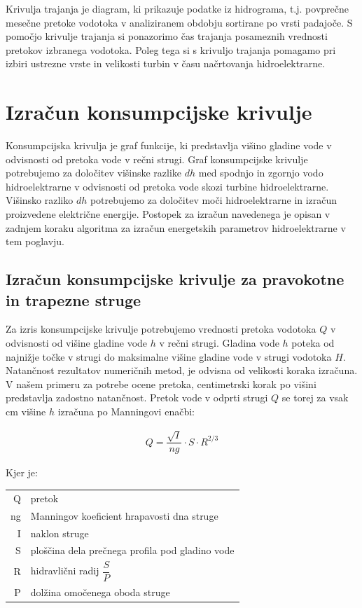 Krivulja trajanja je diagram, ki prikazuje podatke iz hidrograma, t.j. povprečne mesečne pretoke vodotoka v analiziranem obdobju sortirane po vrsti padajoče. S pomočjo krivulje trajanja si ponazorimo čas trajanja posameznih vrednosti pretokov izbranega vodotoka. Poleg tega si s krivuljo trajanja pomagamo pri izbiri ustrezne vrste in velikosti turbin v času načrtovanja hidroelektrarne.


\section{Izračun konsumpcijske krivulje}
Konsumpcijska krivulja je graf funkcije, ki predstavlja višino gladine vode v odvisnosti od pretoka vode v rečni strugi. Graf konsumpcijske krivulje potrebujemo za določitev višinske razlike $dh$ med spodnjo in zgornjo vodo hidroelektrarne v odvisnosti od pretoka vode skozi turbine hidroelektrarne. Višinsko razliko $dh$ potrebujemo za določitev moči hidroelektrarne in izračun proizvedene električne energije. Postopek za izračun navedenega je opisan v zadnjem koraku algoritma za izračun energetskih parametrov hidroelektrarne v tem poglavju.



\subsection{Izračun konsumpcijske krivulje za pravokotne in trapezne struge} \label{sec:teorija_trapeznaMetoda}
Za izris konsumpcijske krivulje potrebujemo vrednosti pretoka vodotoka $Q$ v odvisnosti od višine gladine vode $h$ v rečni strugi. Gladina vode $h$ poteka od najnižje točke v strugi do maksimalne višine gladine vode v strugi vodotoka $H$. Natančnost rezultatov numeričnih metod, je odvisna od velikosti koraka izračuna. V našem primeru za potrebe ocene pretoka, centimetrski korak po višini predstavlja zadostno natančnost. Pretok vode v odprti strugi $Q$ se torej za vsak cm višine $h$ izračuna po Manningovi enačbi: 

\begin{ceqn}
\begin{align}
Q = \dfrac{\sqrt{I}}{ng} \cdot S \cdot R^{2/3} \label{eq:ManningovaEnacba}
\end{align}
\end{ceqn}


Kjer je:
\begin{table}[H]
	\begin{tabular}{r|p{10cm}}
		Q & pretok \\
		ng & Manningov koeficient hrapavosti dna struge\\
		I & naklon struge \\
		S & ploščina dela prečnega profila pod gladino vode\\
		R & hidravlični radij $\dfrac{S}{P}$\\
		P & dolžina omočenega oboda struge\\
	\end{tabular}
\end{table}

